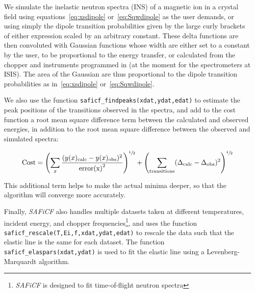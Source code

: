 \documentclass[12pt,onecolumn,tightenlines,aps,amsmath,floatfix,notitlepage,nofootinbib]{revtex4}
\begin{document}
We simulate the inelastic neutron spectra (INS) of a magnetic ion in a crystal field using equations~\ref{eq:xsdipole} or~\ref{eq:Sqwdipole} as the user demands, or using simply the dipole transition probabilities given by the large curly brackets of either expression scaled by an arbitrary constant. These delta functions are then convoluted with Gaussian functions whose width are either set to a constant by the user, to be proportional to the energy transfer, or calculated from the chopper and instruments programmed in (at the moment for the spectrometers at ISIS). The area of the Gaussian are thus proportional to the dipole transition probabilities as in~\ref{eq:xsdipole} or~\ref{eq:Sqwdipole}. 

We also use the function \texttt{saficf\_findpeaks(xdat,ydat,edat)} to estimate the peak positions of the transitions observed in the spectra, and add to the cost function a root mean square difference term between the calculated and observed energies, in addition to the root mean square difference between the observed and simulated spectra:

\begin{equation}
\textrm{Cost} = \left( \sum_x \frac{( y(x)_\textrm{calc} - y(x)_\textrm{obs} )^2}{\textrm{error(x)}^2} \right)^{\sfrac{1}{2}} + \left( \sum_\textrm{transitions} (\Delta_{\textrm{calc}}-\Delta_{\textrm{obs}})^2 \right)^{\sfrac{1}{2}}
\end{equation}

\noindent This additional term helps to make the actual minima deeper, so that the algorithm will converge more accurately. 

Finally, \emph{SAFiCF} also handles multiple datasets taken at different temperatures, incident energy, and chopper frequencies\footnote{\emph{SAFiCF} is designed to fit time-of-flight neutron spectra}, and uses the function \texttt{saficf\_rescale(T,Ei,f,xdat,ydat,edat)} to rescale the data such that the elastic line is the same for each dataset. The function \texttt{saficf\_elaspars(xdat,ydat)} is used to fit the elastic line using a Levenberg-Marquardt algorithm.





\end{document}
